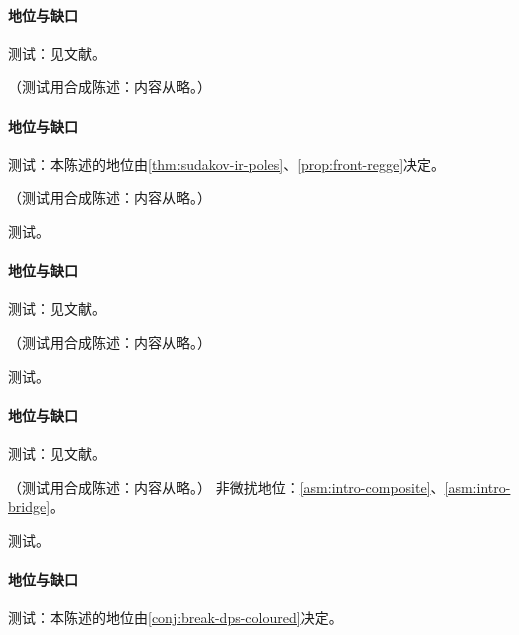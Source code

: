 \paragraph{地位与缺口}测试：见文献。

\begin{proposition}\label{prop:front-regge-pole}
（测试用合成陈述：内容从略。）
\end{proposition}
\paragraph{地位与缺口}测试：本陈述的地位由\cref{thm:sudakov-ir-poles}、\cref{prop:front-regge}决定。

\begin{proposition}\label{prop:front-smallx-tmd}
（测试用合成陈述：内容从略。）
\end{proposition}
\begin{proofsketch}测试。\end{proofsketch}
\paragraph{地位与缺口}测试：见文献。

\begin{proposition}\label{prop:front-smallx-helicity}
（测试用合成陈述：内容从略。）
\end{proposition}
\begin{proofsketch}测试。\end{proofsketch}
\paragraph{地位与缺口}测试：见文献。

\begin{proposition}\label{prop:front-dps-scheme}
（测试用合成陈述：内容从略。）
非微扰地位：\cref{asm:intro-composite}、\cref{asm:intro-bridge}。
\end{proposition}
\begin{proofsketch}测试。\end{proofsketch}
\paragraph{地位与缺口}测试：本陈述的地位由\cref{conj:break-dps-coloured}决定。

